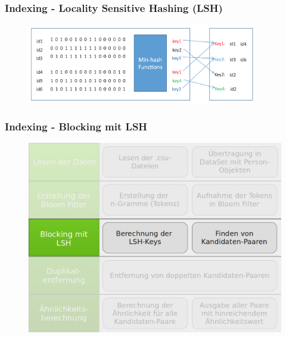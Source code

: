 \documentclass{beamer}
\begin{document}
    \begin{frame}
        \frametitle{Indexing - Locality Sensitive Hashing (LSH)}

            \begin{figure}[H]
                \includegraphics[width=0.9\textwidth]{graphics/lsh_intro.png}
            \end{figure}


    \end{frame}

    \begin{frame}
    		\frametitle{Indexing - Blocking mit LSH}
    		\begin{figure}[H]
    			\includegraphics[width=\textwidth]{graphics/process_3.png}
    		\end{figure}
    \end{frame}
    
\end{document}
